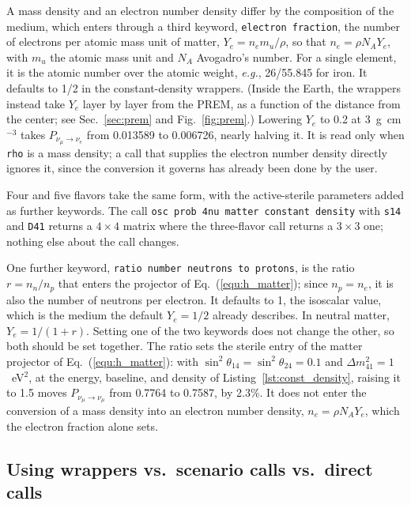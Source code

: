 \documentclass[final,5p,times,twocolumn,sort,compress]{elsarticle}
\makeatletter
\newcommand{\eg}{{\it e.g.}}
\newcommand{\eq}{Eq.}
\newcommand{\fig}{Fig.}
\DeclareRobustCommand{\_}{%
  \ifmmode\nfss@text{\textunderscore}\else\textunderscore\allowbreak\fi}
\newcommand{\equ}[1]{\eq~(\ref{equ:#1})}
\newcommand{\figu}[1]{\fig~\ref{fig:#1}}
\makeatother
\begin{document}
A mass density and an electron number density differ by the composition of the medium, which enters through a third keyword, {\tt electron\_fraction}, the number of electrons per atomic mass unit of matter, $Y_e = n_e m_u/\rho$, so that $n_e = \rho N_A Y_e$, with $m_u$ the atomic mass unit and $N_A$ Avogadro's number. For a single element, it is the atomic number over the atomic weight, \eg, 26/55.845 for iron. It defaults to 1/2 in the constant-density wrappers. (Inside the Earth, the wrappers instead take $Y_e$ layer by layer from the PREM, as a function of the distance from the center; see Sec.~\ref{sec:prem} and \figu{prem}.) Lowering $Y_e$ to 0.2 at 3~g~cm$^{-3}$ takes $P_{\nu_\mu \to \nu_e}$ from 0.013589 to 0.006726, nearly halving it. It is read only when {\tt rho} is a mass density; a call that supplies the electron number density directly ignores it, since the conversion it governs has already been done by the user.

Four and five flavors take the same form, with the active-sterile parameters added as further keywords. The call {\tt osc\_prob\_4nu\_matter\_constant\_density} with {\tt s14} and {\tt D41} returns a $4 \times 4$ matrix where the three-flavor call returns a $3 \times 3$ one; nothing else about the call changes.

One further keyword, {\tt ratio\_number\_neutrons\_to\_protons}, is the ratio $r = n_n/n_p$ that enters the projector of \equ{h_matter}; since $n_p = n_e$, it is also the number of neutrons per electron. It defaults to 1, the isoscalar value, which is the medium the default $Y_e = 1/2$ already describes. In neutral matter, $Y_e = 1/(1 + r)$. Setting one of the two keywords does not change the other, so both should be set together. The ratio sets the sterile entry of the matter projector of \equ{h_matter}: with $\sin^2\theta_{14} = \sin^2\theta_{24} = 0.1$ and $\Delta m^2_{41} = 1$~eV$^2$, at the energy, baseline, and density of Listing~\ref{lst:const_density}, raising it to 1.5 moves $P_{\nu_\mu \to \nu_\mu}$ from 0.7764 to 0.7587, by 2.3\%. It does not enter the conversion of a mass density into an electron number density, $n_e = \rho N_A Y_e$, which the electron fraction alone sets.


\subsection{Using wrappers vs.~scenario calls vs.~direct calls}
\label{sec:wrapper_vs_direct}
\end{document}
